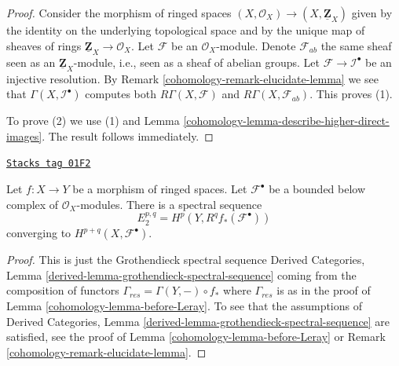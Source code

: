 \begin{proof}

Consider the morphism of ringed spaces
$(X, \mathcal{O}_X) \to (X, \underline{\mathbf{Z}}_X)$ given
by the identity on the underlying topological space and by
the unique map of sheaves of rings
$\underline{\mathbf{Z}}_X \to \mathcal{O}_X$.
Let $\mathcal{F}$ be an $\mathcal{O}_X$-module.
Denote $\mathcal{F}_{ab}$ the same sheaf seen as an
$\underline{\mathbf{Z}}_X$-module, i.e., seen as a sheaf of
abelian groups. Let
$\mathcal{F} \to \mathcal{I}^\bullet$ be an injective resolution.
By Remark \ref{cohomology-remark-elucidate-lemma} we see that
$\Gamma(X, \mathcal{I}^\bullet)$ computes both
$R\Gamma(X, \mathcal{F})$ and $R\Gamma(X, \mathcal{F}_{ab})$.
This proves (1).

\medskip\noindent
To prove (2) we use (1) and Lemma \ref{cohomology-lemma-describe-higher-direct-images}.
The result follows immediately.
\end{proof}

\begin{lemma}

\label{cohomology-lemma-Leray}
\href{https://stacks.math.columbia.edu/tag/01F2}{\texttt{Stacks tag 01F2}}

Let $f : X \to Y$ be a morphism of ringed spaces.
Let $\mathcal{F}^\bullet$ be
a bounded below complex of $\mathcal{O}_X$-modules.
There is a spectral sequence
$$
E_2^{p, q} = H^p(Y, R^qf_*(\mathcal{F}^\bullet))
$$
converging to $H^{p + q}(X, \mathcal{F}^\bullet)$.
\end{lemma}

\begin{proof}

This is just the Grothendieck spectral sequence
Derived Categories, Lemma \ref{derived-lemma-grothendieck-spectral-sequence}
coming from the composition of functors
$\Gamma_{res} = \Gamma(Y, -) \circ f_*$ where $\Gamma_{res}$ is as
in the proof of Lemma \ref{cohomology-lemma-before-Leray}.
To see that the assumptions of
Derived Categories, Lemma \ref{derived-lemma-grothendieck-spectral-sequence}
are satisfied, see the proof of Lemma \ref{cohomology-lemma-before-Leray} or
Remark \ref{cohomology-remark-elucidate-lemma}.
\end{proof}

